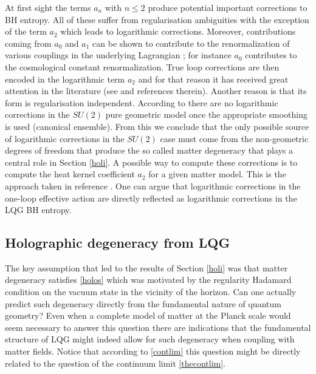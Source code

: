 \documentclass[aps, nofootinbib,superscriptaddress,12pt]{revtex4-2}
\begin{document}
At first sight the terms $a_n$ with $n\le 2$ produce potential important corrections to BH entropy. All of these suffer from regularisation ambiguities with the exception of the term $a_2$ which leads to logarithmic corrections.
Moreover, contributions coming from $a_0$ and $a_1$ can be shown to contribute to the renormalization of various couplings in the underlying Lagrangian \cite{Sen:2012dw}; for instance $a_0$ contributes to the cosmological constant renormalization. 
True loop corrections are then encoded in the logarithmic term $a_2$ and for that reason it has received great attention in the literature (see \cite{Sen:2012dw} and references therein). Another reason is that its form is regularisation independent.   
According to \cite{G.:2011zr} there are no logarithmic corrections in the $SU(2)$ pure geometric 
model once the appropriate smoothing is used (canonical ensemble). From this we conclude that the only possible source of logarithmic corrections in the $SU(2)$ case must come from the non-geometric degrees of freedom that produce the so called matter degeneracy that plays a central role in Section \ref{holi}. A possible way to compute these corrections is to compute the heat kernel coefficient $a_2$ for a given matter model. This is the approach taken in reference \cite{Sen:2012dw}. 
One can argue \cite{Ghosh:2013iwa} that logarithmic corrections in the one-loop effective action are directly  reflected as logarithmic corrections in the LQG  BH entropy. 

\subsection{Holographic degeneracy from LQG}\label{stringy}

The key assumption that led to the results of  Section \ref{holi}  was that matter degeneracy satisfies \eqref{holos} which was motivated by the regularity Hadamard condition on the vacuum state in the vicinity of the horizon.  
Can one actually predict such degeneracy directly from the fundamental nature of quantum geometry?
Even when a complete model of matter at the Planck scale would seem necessary to answer this question there are indications that the fundamental structure of LQG might indeed allow for such degeneracy when coupling with matter fields.
Notice that according to \ref{contlim} this question might be directly related to the question of the continuum limit \ref{thecontlim}. 
\end{document}
